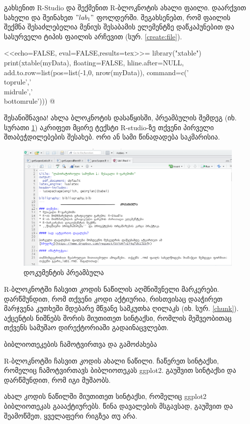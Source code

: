 \documentclass{article}
\begin{document}
გახსენით R-Studio და შექმენით R-ბლოკნოტის ახალი ფაილი. დაარქვით სახელი და შეინახეთ $"lab_1"$ ფოლდერში. შეგახსენებთ, რომ ფაილის შექმნა შესაძლებელია მენიუს შესაბამის ელემენტზე დაწკაპუნებით და სასურველი ტიპის ფაილის არჩევით (სურ. \ref{create:file}).

<<echo=FALSE, eval=FALSE,results=tex>>=
library("xtable")
print(xtable(myData),
  floating=FALSE,
  hline.after=NULL,
  add.to.row=list(pos=list(-1,0, nrow(myData)),
  command=c('\\toprule\n','\\midrule\n','\\bottomrule\n')))
@


შესანიშნავია! ახლა ბლოკნოტის დასაწყისში, პრეამბულის შემდეგ (იხ. სურათი \ref{preamble}) აკრიფეთ მცირე ტექსტი R-studio-ზე თქვენი პირველი შთაბეჭდილებების შესახებ. ორი ან სამი წინადადება საკმარისია.

\begin{figure}[h]
\centering
\includegraphics[width=\textwidth]{img/preamble.PNG}
\caption{დოკუმენტის პრეამბულა}
    \label{preamble}
\end{figure}

R-ბლოკნოტში ჩასვით კოდის ნაწილის აღმნიშვნელი მარკერები. დარწმუნდით, რომ თქვენი კოდი აქტიურია, რისთვისაც დააჭირეთ მარჯვენა კუთხეში მდებარე მწვანე სამკუთხა ღილაკს (იხ. სურ. \ref{chunk}). აქცენტის ნიშნებს შორის მიუთითეთ სინტაქსი, რომლის მეშვეობითაც თქვენს სამუშაო დირექტორიაში გადაინაცვლებთ.


ბიბლიოთეკების ჩამოტვირთვა და გამოძახება

R-ბლოკნოტში ჩასვით კოდის ახალი ნაწილი. ჩაწერეთ სინტაქსი, რომელიც ჩამოტვირთავს ბიბლიოთეკას ggplot2. გაუშვით სინტაქსი და დარწმუნდით, რომ იგი მუშაობს.

ახალ კოდის ნაწილში მიუთითეთ სინტაქსი, რომელიც ggplot2 ბიბლიოთეკას გაააქტიურებს. წინა დავალების მსგავსად, გაუშვით და შეამოწმეთ, ყველაფერი რიგზეა თუ არა.
\end{document}
